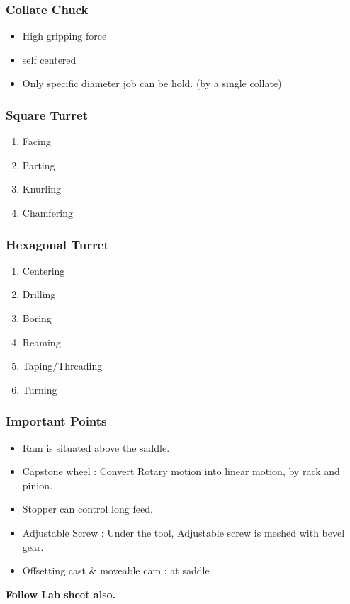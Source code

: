 \documentclass{article}
\begin{document}
\begin{multicols}{2}
\subsubsection*{Collate Chuck}
\begin{itemize}
  \item High gripping force 
  \item self centered
  \item Only specific diameter job can be hold. (by a single collate)
\end{itemize}

\subsubsection*{Square Turret}
\begin{enumerate}
  \item Facing 
  \item Parting 
  \item Knurling 
  \item Chamfering 
\end{enumerate}

\subsubsection*{Hexagonal Turret}
\begin{enumerate}
  \item Centering 
  \item Drilling
  \item Boring
  \item Reaming 
  \item Taping/Threading 
  \item Turning 
\end{enumerate}

\subsubsection*{Important Points}
\begin{itemize}
  \item Ram is situated above the saddle. 
  \item Capstone wheel : Convert Rotary motion into linear motion, by rack and pinion. 
  \item Stopper can control long feed. 
  \item Adjustable Screw : Under the tool, Adjustable screw is meshed with bevel gear.
  \item Offsetting cast \& moveable cam : at saddle 
\end{itemize}

\end{multicols}
\textbf{Follow Lab sheet also.}\\
\hrulefill
\end{document}
